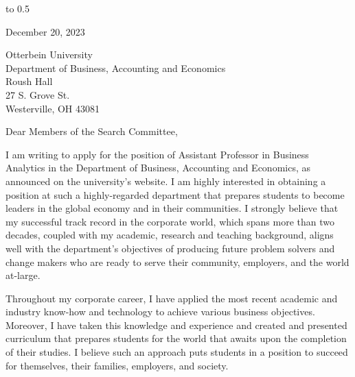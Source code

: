 

\noindent\hbox to 0.5\textwidth{}

December 20, 2023\\

\vspace{2.0ex}

Otterbein University \\
Department of Business, Accounting and Economics \\
Roush Hall \\
27 S. Grove St. \\
Westerville, OH 43081 \\

\vspace{2.0ex}

Dear Members of the Search Committee, \\

\vspace{2.0ex}


I am writing to apply for the position of Assistant Professor in Business Analytics in the Department of Business, Accounting and Economics, as announced on the university's website.  I am highly interested in obtaining a position at such a highly-regarded department that prepares students to become leaders in the global economy and in their communities.  I strongly believe that my successful track record in the corporate world, which spans more than two decades, coupled with my academic, research and teaching background, aligns well with the department's objectives of producing future problem solvers and change makers who are ready to serve their community, employers, and the world at-large. \\

\vspace{2.0ex}

Throughout my corporate career, I have applied the most recent academic and industry know-how and technology to achieve various business objectives.  Moreover, I have taken this knowledge and experience and created and presented curriculum that prepares students for the world that awaits upon the completion of their studies.  I believe such an approach puts students in a position to succeed for themselves, their families, employers, and society. 


